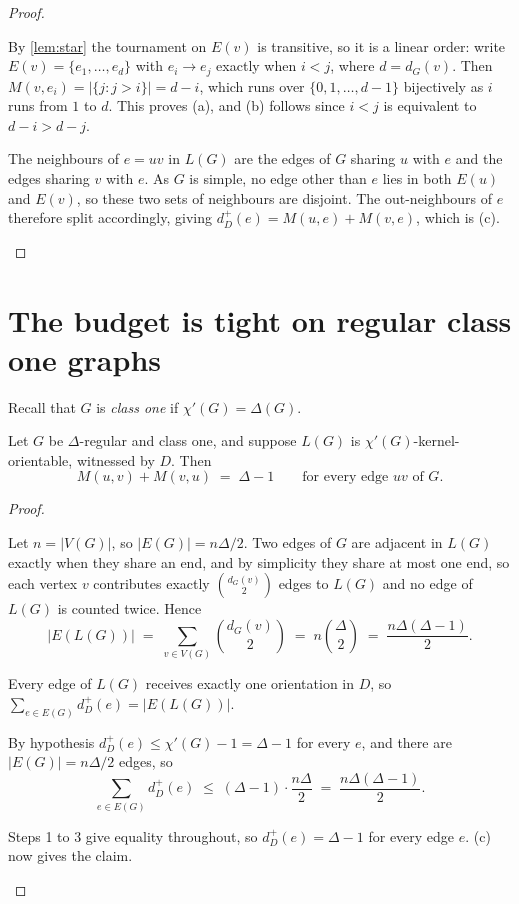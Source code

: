 \documentclass[11pt]{article}
\numberwithin{equation}{section}
\theoremstyle{plain}
\newcommand{\dip}{d^{+}}
\newcommand{\LG}{L}
\begin{document}
\begin{proof}
\begin{steps}
\item By \cref{lem:star} the tournament on $E(v)$ is transitive, so it is a linear order:
write $E(v)=\{e_1,\dots,e_d\}$ with $e_i\to e_j$ exactly when $i<j$, where $d=d_G(v)$. Then
$M(v,e_i)=|\{j:j>i\}|=d-i$, which runs over $\{0,1,\dots,d-1\}$ bijectively as $i$ runs from
$1$ to $d$. This proves (a), and (b) follows since $i<j$ is equivalent to $d-i>d-j$.

\item The neighbours of $e=uv$ in $\LG(G)$ are the edges of $G$ sharing $u$ with $e$ and the
edges sharing $v$ with $e$. As $G$ is simple, no edge other than $e$ lies in both $E(u)$ and
$E(v)$, so these two sets of neighbours are disjoint. The out-neighbours of $e$ therefore
split accordingly, giving $\dip_D(e)=M(u,e)+M(v,e)$, which is (c). \qedhere
\end{steps}
\end{proof}

\section{The budget is tight on regular class one graphs}\label{sec:budget}

Recall that $G$ is \emph{class one} if $\chi'(G)=\Delta(G)$.

\begin{lemma}\label{lem:budget}
Let $G$ be $\Delta$-regular and class one, and suppose $\LG(G)$ is
$\chi'(G)$-kernel-orientable, witnessed by $D$. Then
\[
  M(u,v)+M(v,u)\;=\;\Delta-1\qquad\text{for every edge } uv \text{ of } G .
\]
\end{lemma}

\begin{proof}
\begin{steps}
\item Let $n=|V(G)|$, so $|E(G)|=n\Delta/2$. Two edges of $G$ are adjacent in $\LG(G)$
exactly when they share an end, and by simplicity they share at most one end, so each
vertex $v$ contributes exactly $\binom{d_G(v)}{2}$ edges to $\LG(G)$ and no edge of $\LG(G)$
is counted twice. Hence
\[
  |E(\LG(G))|\;=\;\sum_{v\in V(G)}\binom{d_G(v)}{2}\;=\;n\binom{\Delta}{2}
  \;=\;\frac{n\Delta(\Delta-1)}{2}.
\]

\item Every edge of $\LG(G)$ receives exactly one orientation in $D$, so
$\sum_{e\in E(G)}\dip_D(e)=|E(\LG(G))|$.

\item By hypothesis $\dip_D(e)\le\chi'(G)-1=\Delta-1$ for every $e$, and there are
$|E(G)|=n\Delta/2$ edges, so
\[
  \sum_{e\in E(G)}\dip_D(e)\;\le\;(\Delta-1)\cdot\frac{n\Delta}{2}
  \;=\;\frac{n\Delta(\Delta-1)}{2}.
\]

\item Steps 1 to 3 give equality throughout, so $\dip_D(e)=\Delta-1$ for every edge $e$.
(c) now gives the claim. \qedhere
\end{steps}
\end{proof}
\end{document}
